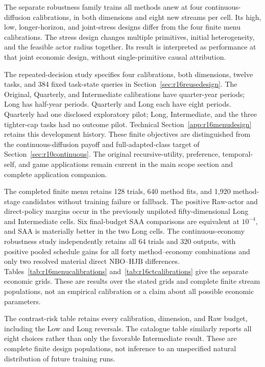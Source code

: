 The separate robustness family trains all methods anew at four continuous-diffusion calibrations, in both dimensions and eight new streams per cell. Its high, low, longer-horizon, and joint-stress designs differ from the four finite menu calibrations. The stress design changes multiple primitives, initial heterogeneity, and the feasible actor radius together. Its result is interpreted as performance at that joint economic design, without single-primitive causal attribution.

The repeated-decision study specifies four calibrations, both dimensions, twelve tasks, and 384 fixed task-state queries in Section~\ref{sec:r16reusedesign}. The Original, Quarterly, and Intermediate calibrations have quarter-year periods; Long has half-year periods. Quarterly and Long each have eight periods. Quarterly had one disclosed exploratory pilot; Long, Intermediate, and the three tighter-cap tasks had no outcome pilot. Technical Section~\ref{app:r16menudesign} retains this development history. These finite objectives are distinguished from the continuous-diffusion payoff and full-adapted-class target of Section~\ref{sec:r10continuous}. The original recursive-utility, preference, temporal-self, and game applications remain current in the main scope section and complete application companion.

The completed finite menu retains 128 trials, 640 method fits, and 1,920 method-stage candidates without training failure or fallback. The positive Raw-actor and direct-policy margins occur in the previously unpiloted fifty-dimensional Long and Intermediate cells. Six final-budget SAA comparisons are equivalent at $10^{-4}$, and SAA is materially better in the two Long cells. The continuous-economy robustness study independently retains all 64 trials and 320 outputs, with positive pooled schedule gains for all forty method--economy combinations and only two resolved material direct NBO--HJB differences. Tables~\ref{tab:r16menucalibrations} and~\ref{tab:r16ctcalibrations} give the separate economic grids. These are results over the stated grids and complete finite stream populations, not an empirical calibration or a claim about all possible economic parameters.


The contrast-risk table retains every calibration, dimension, and Raw budget, including the Low and Long reversals. The catalogue table similarly reports all eight choices rather than only the favorable Intermediate result. These are complete finite design populations, not inference to an unspecified natural distribution of future training runs.

